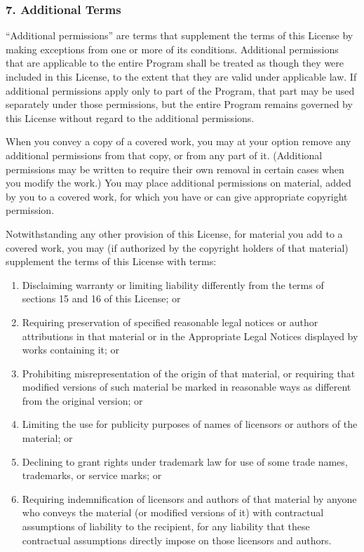 \documentclass[a4paper, 11pt, twoside]{article}
\begin{document}
\subsubsection{7. Additional Terms}

“Additional permissions” are terms that supplement the terms of this License by making exceptions from one or more of its conditions. Additional permissions that are applicable to the entire Program shall be treated as though they were included in this License, to the extent that they are valid under applicable law. If additional permissions apply only to part of the Program, that part may be used separately under those permissions, but the entire Program remains governed by this License without regard to the additional permissions.

When you convey a copy of a covered work, you may at your option remove any additional permissions from that copy, or from any part of it. (Additional permissions may be written to require their own removal in certain cases when you modify the work.) You may place additional permissions on material, added by you to a covered work, for which you have or can give appropriate copyright permission.

Notwithstanding any other provision of this License, for material you add to a covered work, you may (if authorized by the copyright holders of that material) supplement the terms of this License with terms:

\begin{enumerate}[label=\Alph*)]
\item Disclaiming warranty or limiting liability differently from the terms of sections 15 and 16 of this License; or
\item Requiring preservation of specified reasonable legal notices or author attributions in that material or in the Appropriate Legal Notices displayed by works containing it; or
\item Prohibiting misrepresentation of the origin of that material, or requiring that modified versions of such material be marked in reasonable ways as different from the original version; or
\item Limiting the use for publicity purposes of names of licensors or authors of the material; or
\item Declining to grant rights under trademark law for use of some trade names, trademarks, or service marks; or 
\item Requiring indemnification of licensors and authors of that material by anyone who conveys the material (or modified versions of it) with contractual assumptions of liability to the recipient, for any liability that these contractual assumptions directly impose on those licensors and authors.
\end{enumerate}
\end{document}

